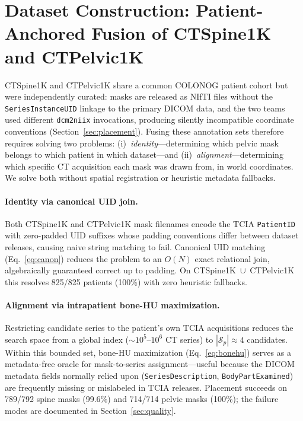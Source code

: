\documentclass[pmlr]{jmlr}
\begin{document}
\section{Dataset Construction: Patient-Anchored Fusion of CTSpine1K
and CTPelvic1K}
\label{sec:generalizable}

CTSpine1K and CTPelvic1K share a common COLONOG patient cohort but
were independently curated: masks are released as NIfTI files
without the \texttt{SeriesInstanceUID} linkage to the primary DICOM
data, and the two teams used different \texttt{dcm2niix}
invocations, producing silently incompatible coordinate conventions
(Section~\ref{sec:placement}).
Fusing these annotation sets therefore requires solving two
problems: (i)~\emph{identity}---determining which pelvic mask
belongs to which patient in which dataset---and
(ii)~\emph{alignment}---determining which specific CT acquisition
each mask was drawn from, in world coordinates.
We solve both without spatial registration or heuristic metadata
fallbacks.

\paragraph{Identity via canonical UID join.}
Both CTSpine1K and CTPelvic1K mask filenames encode the TCIA
\texttt{PatientID} with zero-padded UID suffixes whose padding
conventions differ between dataset releases, causing naive string
matching to fail. Canonical UID matching (Eq.~\ref{eq:canon})
reduces the problem to an $O(N)$ exact relational join,
algebraically guaranteed correct up to padding. On
\mbox{CTSpine1K~$\cup$~CTPelvic1K} this resolves 825/825 patients
(100\%) with zero heuristic fallbacks.

\paragraph{Alignment via intrapatient bone-HU maximization.}
Restricting candidate series to the patient's own TCIA acquisitions
reduces the search space from a global index
($\sim$$10^5$--$10^6$ CT series) to
$|\mathcal{S}_p| \approx 4$ candidates. Within this bounded set,
bone-HU maximization (Eq.~\ref{eq:bonehu}) serves as a
metadata-free oracle for mask-to-series assignment---useful because
the DICOM metadata fields normally relied upon
(\texttt{SeriesDescription}, \texttt{BodyPartExamined}) are
frequently missing or mislabeled in TCIA releases.
Placement succeeds on 789/792 spine masks (99.6\%) and 714/714
pelvic masks (100\%); the failure modes are documented in
Section~\ref{sec:quality}.
\end{document}
